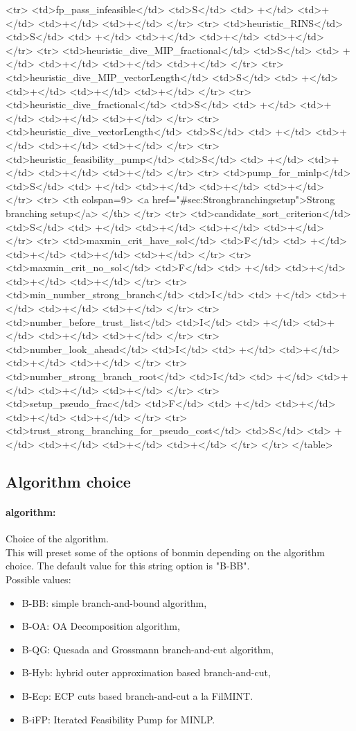 {{<tr>
<td>fp_pass_infeasible</td>
<td>S</td>
<td> +</td>
<td>+</td>
<td>+</td>
<td>+</td>
</tr>
<tr>
<td>heuristic_RINS</td>
<td>S</td>
<td> +</td>
<td>+</td>
<td>+</td>
<td>+</td>
</tr>
<tr>
<td>heuristic_dive_MIP_fractional</td>
<td>S</td>
<td> +</td>
<td>+</td>
<td>+</td>
<td>+</td>
</tr>
<tr>
<td>heuristic_dive_MIP_vectorLength</td>
<td>S</td>
<td> +</td>
<td>+</td>
<td>+</td>
<td>+</td>
</tr>
<tr>
<td>heuristic_dive_fractional</td>
<td>S</td>
<td> +</td>
<td>+</td>
<td>+</td>
<td>+</td>
</tr>
<tr>
<td>heuristic_dive_vectorLength</td>
<td>S</td>
<td> +</td>
<td>+</td>
<td>+</td>
<td>+</td>
</tr>
<tr>
<td>heuristic_feasibility_pump</td>
<td>S</td>
<td> +</td>
<td>+</td>
<td>+</td>
<td>+</td>
</tr>
<tr>
<td>pump_for_minlp</td>
<td>S</td>
<td> +</td>
<td>+</td>
<td>+</td>
<td>+</td>
</tr>
<tr>   <th colspan=9> <a href="#sec:Strongbranchingsetup">Strong branching setup</a> </th>
</tr>
<tr>
<td>candidate_sort_criterion</td>
<td>S</td>
<td> +</td>
<td>+</td>
<td>+</td>
<td>+</td>
</tr>
<tr>
<td>maxmin_crit_have_sol</td>
<td>F</td>
<td> +</td>
<td>+</td>
<td>+</td>
<td>+</td>
</tr>
<tr>
<td>maxmin_crit_no_sol</td>
<td>F</td>
<td> +</td>
<td>+</td>
<td>+</td>
<td>+</td>
</tr>
<tr>
<td>min_number_strong_branch</td>
<td>I</td>
<td> +</td>
<td>+</td>
<td>+</td>
<td>+</td>
</tr>
<tr>
<td>number_before_trust_list</td>
<td>I</td>
<td> +</td>
<td>+</td>
<td>+</td>
<td>+</td>
</tr>
<tr>
<td>number_look_ahead</td>
<td>I</td>
<td> +</td>
<td>+</td>
<td>+</td>
<td>+</td>
</tr>
<tr>
<td>number_strong_branch_root</td>
<td>I</td>
<td> +</td>
<td>+</td>
<td>+</td>
<td>+</td>
</tr>
<tr>
<td>setup_pseudo_frac</td>
<td>F</td>
<td> +</td>
<td>+</td>
<td>+</td>
<td>+</td>
</tr>
<tr>
<td>trust_strong_branching_for_pseudo_cost</td>
<td>S</td>
<td> +</td>
<td>+</td>
<td>+</td>
<td>+</td>
</tr>
</tr>
</table>
}
}
\subsection{Algorithm choice}
\label{sec:Algorithmchoice}
\paragraph{algorithm:}\label{opt:algorithm} Choice of the algorithm. \\
 This will preset some of the options of bonmin depending on the algorithm choice. The default value for this string option is "B-BB".
\\ 
Possible values:
\begin{itemize}
   \item B-BB: simple branch-and-bound algorithm,
   \item B-OA: OA Decomposition algorithm,
   \item B-QG: Quesada and Grossmann branch-and-cut algorithm,
   \item B-Hyb: hybrid outer approximation based branch-and-cut,
   \item B-Ecp: ECP cuts based branch-and-cut a la FilMINT.
   \item B-iFP: Iterated Feasibility Pump for MINLP.
\end{itemize}

